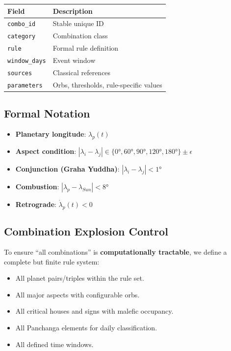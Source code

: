 \documentclass[
  11pt,
  a4paper,
  oneside,
  openany]{article}
\providecommand{\tightlist}{%
  \setlength{\itemsep}{0pt}\setlength{\parskip}{0pt}}\usepackage{longtable,booktabs,array}
\begin{document}
\begin{longtable}[]{@{}ll@{}}
\toprule\noalign{}
Field & Description \\
\midrule\noalign{}
\endhead
\bottomrule\noalign{}
\endlastfoot
\texttt{combo\_id} & Stable unique ID \\
\texttt{category} & Combination class \\
\texttt{rule} & Formal rule definition \\
\texttt{window\_days} & Event window \\
\texttt{sources} & Classical references \\
\texttt{parameters} & Orbs, thresholds, rule-specific values \\
\end{longtable}

\subsection{Formal Notation}\label{formal-notation}

\begin{itemize}
\tightlist
\item
  \textbf{Planetary longitude}: \(\lambda_p(t)\)
\item
  \textbf{Aspect condition}:
  \(|\lambda_i - \lambda_j| \in \{0°, 60°, 90°, 120°, 180°\} \pm \epsilon\)
\item
  \textbf{Conjunction (Graha Yuddha)}: \(|\lambda_i - \lambda_j| < 1°\)
\item
  \textbf{Combustion}: \(|\lambda_p - \lambda_{Sun}| < 8°\)
\item
  \textbf{Retrograde}: \(\dot{\lambda}_p(t) < 0\)
\end{itemize}

\subsection{Combination Explosion
Control}\label{combination-explosion-control}

To ensure ``all combinations'' is \textbf{computationally tractable}, we
define a complete but finite rule system:

\begin{itemize}
\tightlist
\item
  All planet pairs/triples within the rule set.
\item
  All major aspects with configurable orbs.
\item
  All critical houses and signs with malefic occupancy.
\item
  All Panchanga elements for daily classification.
\item
  All defined time windows.
\end{itemize}
\end{document}
